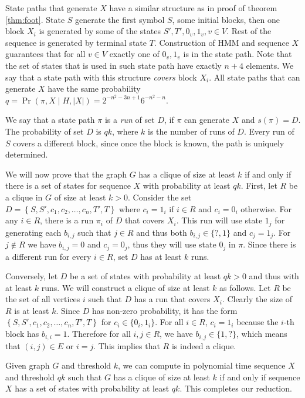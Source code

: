 \begin{reformulate*}
State paths that generate $X$ have a similar structure as in proof of theorem
\ref{thm:foot}. State $S$ generate the first symbol $S$, some initial blocks,
then one block $X_i$ is generated by some of the states $S', T', 0_v, 1_v, v\in
V$.  Rest of the sequence is generated by terminal state $T$.  Construction of
HMM and sequence $X$ guarantees that for all $v\in V$ exactly one of $0_v, 1_v$
is in the state path. Note that the set of states that is used in such state
path have exactly $n+4$ elements. We say that a state path with this structure
\emph{covers} block $X_i$. All state paths that can generate $X$ have the same
probability $q = \Pr(\pi, X\mid H, |X|) = 2^{-n^2-3n+1}6^{-n^2 - n}$.

We say that a state path $\pi$ is a \emph{run} of set $D$, if $\pi$ can generate
$X$ and $s(\pi) = D$. The probability of set $D$ is $qk$, where $k$ is the
number of runs of $D$. Every run of $S$ covers a different block, since once the
block is known, the path is uniquely determined.

We will now prove that the graph $G$ has a clique of size at least $k$
if and only if there is a set of states for sequence $X$ with
probability at least $qk$.  First, let $R$ be a clique in $G$ of size
at least $k>0$.  Consider the set
$D=\left\{S,S',{c_1},{c_2},\dots,{c_n},T',T\right\}$ where $c_i=1_i$ if $i\in R$
and $c_i=0_i$
otherwise. For any $i\in R$, there is a run $\pi_i$ of $D$ that covers
$X_i$. This run will use state $1_j$ for generating each $b_{i,j}$ such
that $j\in R$ and thus both $b_{i,j}\in \{?,1\}$ and $c_j=1_j$.  For
$j\notin R$ we have $b_{i,j}=0$ and $c_j=0_j$, thus they will use state
$0_j$ in $\pi$. Since there is a different run for every $i\in R$, set 
$D$ has at least $k$ runs.

Conversely, let $D$ be a set of states with probability at least $qk>0$
and thus with at least $k$ runs. We will construct a clique of size at
least $k$ as follows. Let $R$ be the set of all vertices $i$ such that
$D$ has a run that covers $X_i$. Clearly the size of $R$ is at least
$k$.  Since $D$ has non-zero probability, it has the form
$\left\{S,S',c_1,c_2,\dots,c_n,T',T\right\}$ for $c_i\in \{0_i,1_i\}$. For all $i\in R$,
$c_i=1_i$ because the $i$-th block has $b_{i,i}=1$. Therefore for all
$i,j\in R$, we have $b_{i,j}\in \{1,?\}$, which means that $(i,j)\in
E$ or $i=j$. This implies that $R$ is indeed a clique.

Given graph $G$ and threshold $k$, we can compute in
polynomial time sequence $X$ and threshold $qk$ such that $G$ has a
clique of size at least $k$ if and only if sequence $X$ has a
set of states with probability at least $qk$. This completes our reduction.


\end{reformulate*}
